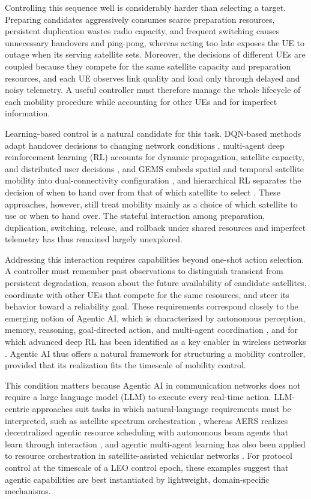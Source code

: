 \documentclass[journal]{IEEEtran}
\begin{document}
Controlling this sequence well is considerably harder than selecting a
target. Preparing candidates aggressively consumes scarce preparation
resources, persistent duplication wastes radio capacity, and frequent
switching causes unnecessary handovers and ping-pong, whereas acting too late
exposes the UE to outage when its serving satellite sets. Moreover, the
decisions of different UEs are coupled because they compete for the same
satellite capacity and preparation resources, and each UE observes link
quality and load only through delayed and noisy telemetry. A useful
controller must therefore manage the whole lifecycle of each mobility
procedure while accounting for other UEs and for imperfect information.

Learning-based control is a natural candidate for this task. DQN-based
methods adapt handover decisions to changing network conditions
\cite{yang2023dqn}, multi-agent deep reinforcement learning (RL) accounts for
dynamic propagation, satellite capacity, and distributed user decisions
\cite{liu2024marlho,yang2024fingerprints}, and GEMS embeds spatial and
temporal satellite mobility into dual-connectivity configuration
\cite{wang2026gems}, and hierarchical RL separates the decision of when to
hand over from that of which satellite to select \cite{zhao2026hrl}. These
approaches, however, still treat mobility mainly as
a choice of which satellite to use or when to hand over. The stateful
interaction among preparation, duplication, switching, release, and rollback
under shared resources and imperfect telemetry has thus remained largely
unexplored.

Addressing this interaction requires capabilities beyond one-shot action
selection. A controller must remember past observations to distinguish
transient from persistent degradation, reason about the future availability
of candidate satellites, coordinate with other UEs that compete for the same
resources, and steer its behavior toward a reliability goal. These
requirements correspond closely to the emerging notion of Agentic AI, which
is characterized by autonomous perception, memory, reasoning, goal-directed
action, and multi-agent coordination
\cite{sapkota2026agentic,jiang2026tutorial,zhang2026edgeagentic}, and for
which advanced deep RL has been identified as a key enabler in wireless
networks \cite{zheng2026agenticdrl}. Agentic AI thus offers a natural
framework for structuring a mobility controller, provided that its
realization fits the timescale of mobility control.

This condition matters because Agentic AI in communication networks does not
require a large language model (LLM) to execute every real-time action.
LLM-centric approaches suit tasks in which natural-language requirements must
be interpreted, such as satellite spectrum orchestration \cite{ni2026llmleo},
whereas AERS realizes decentralized agentic resource scheduling with
autonomous beam agents that learn through interaction \cite{shen2026aers},
and agentic multi-agent learning has also been applied to resource
orchestration in satellite-assisted vehicular networks
\cite{xie2026agenticiov}. For protocol control at the timescale of a LEO
control epoch, these examples suggest that agentic capabilities are best
instantiated by lightweight, domain-specific mechanisms.
\end{document}
